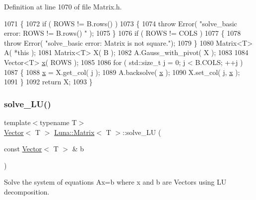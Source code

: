 Definition at line 1070 of file Matrix.\+h.


\begin{DoxyCode}
1071   \{
1072     \textcolor{keywordflow}{if} ( ROWS != B.rows() )
1073     \{
1074       \textcolor{keywordflow}{throw} Error( \textcolor{stringliteral}{"solve\_basic error: ROWS != B.rows() "} );
1075     \}
1076     \textcolor{keywordflow}{if} ( ROWS != COLS )
1077     \{
1078       \textcolor{keywordflow}{throw} Error( \textcolor{stringliteral}{"solve\_basic error: Matrix is not square."});
1079     \}
1080     Matrix<T> A( *\textcolor{keyword}{this} );
1081     Matrix<T> X( B );
1082     A.Gauss\_with\_pivot( X );
1083 
1084     Vector<T> \hyperlink{namespaceHeat__plot_aa88370c16b85b784ccbde3ed88bc1991}{x}( ROWS );
1085 
1086     \textcolor{keywordflow}{for} ( std::size\_t j = 0; j < B.COLS; ++j )
1087     \{
1088       \hyperlink{namespaceHeat__plot_aa88370c16b85b784ccbde3ed88bc1991}{x} = X.get\_col( j );
1089       A.backsolve( \hyperlink{namespaceHeat__plot_aa88370c16b85b784ccbde3ed88bc1991}{x} );
1090       X.set\_col( j, \hyperlink{namespaceHeat__plot_aa88370c16b85b784ccbde3ed88bc1991}{x} );
1091     \}
1092     \textcolor{keywordflow}{return} X;
1093   \}
\end{DoxyCode}
\mbox{\label{classLuna_1_1Matrix_a9e065767864b479a535c4eccce35147d}} 
\subsubsection{\texorpdfstring{solve\+\_\+\+L\+U()}{solve\_LU()}\hspace{0.1cm}{\footnotesize\ttfamily [1/2]}}
{\footnotesize\ttfamily template$<$typename T$>$ \\
\hyperlink{classLuna_1_1Vector}{Vector}$<$ T $>$ \hyperlink{classLuna_1_1Matrix}{Luna\+::\+Matrix}$<$ T $>$\+::solve\+\_\+\+LU (\begin{DoxyParamCaption}\item[{const \hyperlink{classLuna_1_1Vector}{Vector}$<$ T $>$ \&}]{b }\end{DoxyParamCaption})\hspace{0.3cm}{\ttfamily [inline]}}



Solve the system of equations Ax=b where x and b are Vectors using LU decomposition. 


